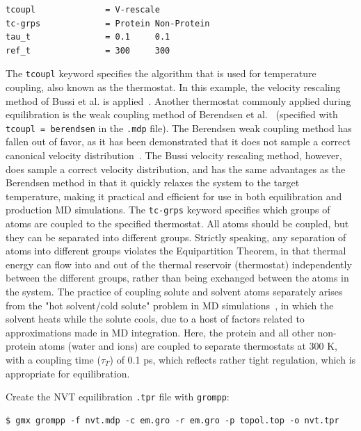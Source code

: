 \documentclass[9pt,tutorial,pubversion]{livecoms}
\begin{document}
\begin{lstlisting}
tcoupl              = V-rescale
tc-grps             = Protein Non-Protein
tau_t               = 0.1     0.1
ref_t               = 300     300
\end{lstlisting}

The \texttt{tcoupl} keyword specifies the algorithm that is used for temperature coupling, also known as the thermostat. In this example, the velocity rescaling method of Bussi et al. is applied~\cite{Bussi2007}. Another thermostat commonly applied during equilibration is the weak coupling method of Berendsen et al.~\cite{Berendsen1984} (specified with \texttt{tcoupl = berendsen} in the \texttt{.mdp} file). The Berendsen weak coupling method has fallen out of favor, as it has been demonstrated that it does not sample a correct canonical velocity distribution~\cite{Bussi2007}. The Bussi velocity rescaling method, however, does sample a correct velocity distribution, and has the same advantages as the Berendsen method in that it quickly relaxes the system to the target temperature, making it practical and efficient for use in both equilibration and production MD simulations. The \texttt{tc-grps} keyword specifies which groups of atoms are coupled to the specified thermostat. All atoms should be coupled, but they can be separated into different groups. Strictly speaking, any separation of atoms into different groups violates the Equipartition Theorem, in that thermal energy can flow into and out of the thermal reservoir (thermostat) independently between the different groups, rather than being exchanged between the atoms in the system. The practice of coupling solute and solvent atoms separately arises from the "hot solvent/cold solute" problem in MD simulations~\cite{Lingenheil2008}, in which the solvent heats while the solute cools, due to a host of factors related to approximations made in MD integration. Here, the protein and all other non-protein atoms (water and ions) are coupled to separate thermostats at 300 K, with a coupling time ($\tau_{T}$) of 0.1 ps, which reflects rather tight regulation, which is appropriate for equilibration.

Create the NVT equilibration \texttt{.tpr} file with \texttt{grompp}:

\begin{lstlisting}
$ gmx grompp -f nvt.mdp -c em.gro -r em.gro -p topol.top -o nvt.tpr
\end{lstlisting}
\end{document}
